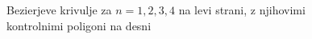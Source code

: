 \documentclass[isrm2, tisk]{fmfdelo}
\begin{document}
\begin{figure}[ht!]
        \qquad
        \caption{Bezierjeve krivulje za $n=1,2,3,4$ na levi strani, z njihovimi kontrolnimi poligoni na desni}
        \label{fig:bezierjeva-krivulja}
    \end{figure}
\end{document}
